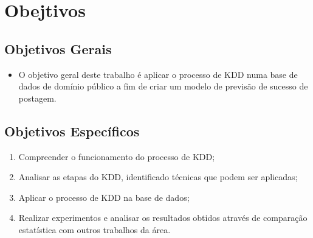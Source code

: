 \section{Obejtivos}

\subsection{Objetivos Gerais}
\begin{frame}
	\begin{itemize}
		\item O objetivo geral deste trabalho é aplicar o processo de KDD numa base de dados de domínio público a fim de criar um modelo de previsão de sucesso de postagem.
	\end{itemize}
\end{frame}

\subsection{Objetivos Específicos}
\begin{frame}
	\begin{enumerate}
		\item Compreender o funcionamento do processo de KDD;
		\item Analisar as etapas do KDD, identificado técnicas que podem ser aplicadas;
		\item Aplicar o processo de KDD na base de dados;
		\item Realizar experimentos e analisar os resultados obtidos através de comparação estatística com outros trabalhos da área.
	\end{enumerate}
\end{frame}